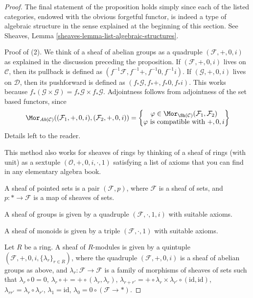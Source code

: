 \begin{proof}
The final statement of the proposition holds simply since each of the listed
categories, endowed with the obvious forgetful functor, is indeed a type of
algebraic structure in the sense explained at the beginning of this section.
See Sheaves, Lemma \ref{sheaves-lemma-list-algebraic-structures}.

\medskip\noindent
Proof of (2). We think of a sheaf of abelian groups as
a quadruple $(\mathcal{F}, +, 0, i)$ as explained in the discussion preceding
the proposition.
If $(\mathcal{F}, +, 0, i)$ lives on $\mathcal{C}$, then its pullback
is defined as $(f^{-1}\mathcal{F}, f^{-1}+, f^{-1}0, f^{-1}i)$.
If $(\mathcal{G}, +, 0, i)$ lives on $\mathcal{D}$, then its pushforward
is defined as $(f_*\mathcal{G}, f_*+, f_*0, f_*i)$. This works because
$f_*(\mathcal{G} \times \mathcal{G}) = f_*\mathcal{G} \times f_*\mathcal{G}$.
Adjointness follows from adjointness of the set based functors,
since
$$
\Mor_{\textit{Ab}(\mathcal{C})}
((\mathcal{F}_1, +, 0, i), (\mathcal{F}_2, +, 0, i))
=
\left\{
\begin{matrix}
\varphi \in \Mor_{\Sh(\mathcal{C})}
(\mathcal{F}_1, \mathcal{F}_2) \\
\varphi \text{ is compatible with }+, 0, i
\end{matrix}
\right\}
$$
Details left to the reader.

\medskip\noindent
This method also works for sheaves of rings by thinking
of a sheaf of rings (with unit) as a sextuple
$(\mathcal{O}, + , 0, i, \cdot, 1)$ satisfying a list
of axioms that you can find in any elementary
algebra book.

\medskip\noindent
A sheaf of pointed sets is a pair $(\mathcal{F}, p)$, where
$\mathcal{F}$ is a sheaf of sets, and $p : * \to \mathcal{F}$
is a map of sheaves of sets.

\medskip\noindent
A sheaf of groups is given by a quadruple $(\mathcal{F}, \cdot, 1, i)$
with suitable axioms.

\medskip\noindent
A sheaf of monoids is given by a triple $(\mathcal{F}, \cdot, 1)$
with suitable axioms.

\medskip\noindent
Let $R$ be a ring. A sheaf of $R$-modules is given by
a quintuple $(\mathcal{F}, +, 0, i, \{\lambda_r\}_{r \in R})$,
where the quadruple $(\mathcal{F}, +, 0, i)$ is a sheaf of
abelian groups as above, and $\lambda_r : \mathcal{F} \to \mathcal{F}$
is a family of morphisms of sheaves of sets
such that
$\lambda_r \circ 0 = 0$,
$\lambda_r \circ + = + \circ (\lambda_r, \lambda_r)$,
$\lambda_{r + r'} =
+ \circ \lambda_r \times \lambda_{r'} \circ (\text{id}, \text{id})$,
$\lambda_{rr'} = \lambda_r \circ \lambda_{r'}$,
$\lambda_1 = \text{id}$, $\lambda_0 = 0 \circ (\mathcal{F} \to *)$.
\end{proof}

